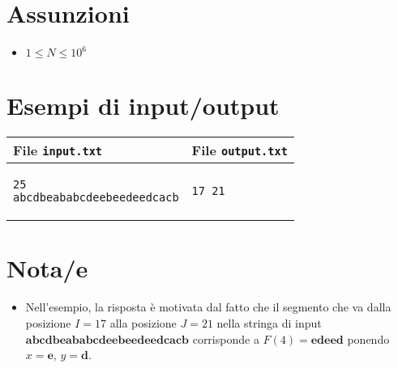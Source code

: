\documentclass[a4paper,11pt]{article}
\begin{document}
\section*{Assunzioni}

\begin{itemize}
  \item $1 ≤ N ≤ 10^{6}$
\end{itemize}


\section*{Esempi di input/output}
    \noindent
    \begin{tabular}{p{11cm}|p{5cm}}
    \toprule
    \textbf{File \texttt{input.txt}}
    & \textbf{File \texttt{output.txt}}
    \\
    \midrule
    \scriptsize
    \begin{verbatim}
25
abcdbeababcdeebeedeedcacb
\end{verbatim}
    &
    \scriptsize
    \begin{verbatim}
17 21
\end{verbatim}
    \\
    \bottomrule
    \end{tabular}


\section*{Nota/e}

\begin{itemize}
  \item Nell'esempio, la risposta è motivata dal fatto che il segmento che va 
    dalla posizione $I = 17$ alla posizione $J = 21$
    nella stringa di input $\mathbf{abcdbeababcdeebeedeedcacb}$ corrisponde a
    $F(4) = \mathbf{edeed}$ ponendo $x = \mathbf{e}$, $y = \mathbf{d}$.
\end{itemize}
\end{document}
